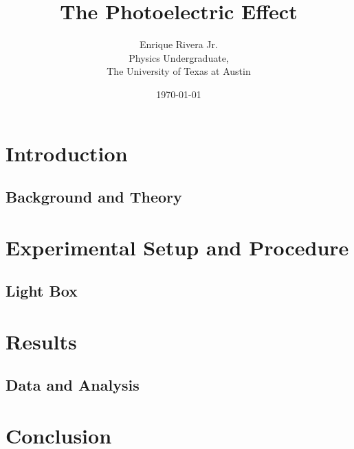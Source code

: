 \documentclass[12pt]{article}
\title{The Photoelectric Effect}
\author{Enrique Rivera Jr. \\
                Physics Undergraduate, \\ 
                The University of Texas at Austin}
\date{\today}
\begin{document}
\maketitle

\begin{abstract}

\end{abstract}

\section{Introduction}
        \subsection{Background and Theory}



\section{Experimental Setup and Procedure}
        \subsection{Light Box}
                

\section{Results}
        \subsection{Data and Analysis}



\section{Conclusion}
\end{document}
